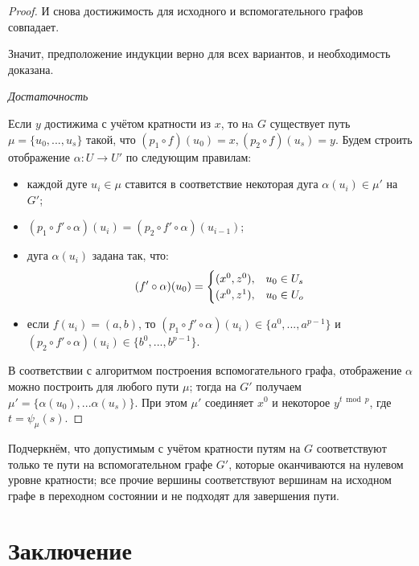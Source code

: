 \begin{proof}
	И снова достижимость для исходного и вспомогательного графов совпадает. 
	
	Значит, предположение индукции верно для всех вариантов, и необходимость доказана.
	
	\textit {Достаточность}
	
	Если $y$ достижима с учётом кратности из $x$, то нa $G$ существует путь $\mu = \{u_0, ... , u_s\}$ такой, что $(p_1 \circ f)(u_0) = x, (p_2 \circ f)(u_s) = y$. Будем строить отображение $\alpha:U\to U'$ по следующим правилам:
	
	\begin{itemize}
		\item каждой дуге $u_i \in \mu$ ставится в соответствие некоторая дуга $\alpha(u_i) \in \mu'$ на $G'$;
		\item $(p_1 \circ f' \circ \alpha)(u_i) = (p_2 \circ f' \circ \alpha)(u_{i-1})$;
		\item дуга $\alpha(u_i)$ задана так, что: 
		\begin{equation*}
		(f' \circ \alpha)(u_0) =
		\begin{cases}
		(x^0, z^0), &\text{$ u_0 \in U_s$}\\
		(x^0, z^1), &\text{$ u_0 \in U_o$}
		\end{cases}
		\end{equation*} 
		
		\item если $f(u_i) = (a, b)$, то $(p_1 \circ f' \circ \alpha)(u_i) \in \{a^0, ... , a^{p-1}\}$ и $(p_2 \circ f' \circ \alpha)(u_i) \in \{b^0, ... , b^{p-1}\}$.
	\end{itemize}
	
	В соответствии с алгоритмом построения вспомогательного графа, отображение $\alpha$ можно построить для любого пути $\mu$; тогда на $G'$ получаем $\mu' = \{\alpha(u_0), ...  \alpha(u_s)\}$. При этом $\mu'$ соединяет $x^0$ и некоторое $y^{t \bmod p}$, где $t = \psi_\mu(s)$.
\end{proof}

Подчеркнём, что допустимым с учётом кратности путям на $G$ соответствуют только те пути на вспомогательном графе $G'$, которые оканчиваются на нулевом уровне кратности; все прочие вершины соответствуют вершинам на исходном графе в переходном состоянии и не подходят для завершения пути.  

\section{Заключение}

